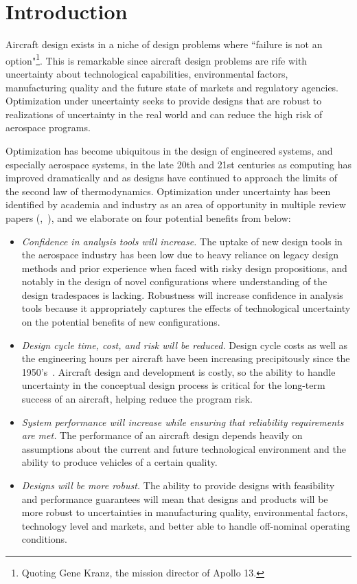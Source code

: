 \section{Introduction}

Aircraft design exists in a niche of design problems where ``failure is
not an option"\footnote{Quoting Gene Kranz, the mission director of Apollo 13.}.
This is remarkable since aircraft design problems are rife with uncertainty about
technological capabilities, environmental factors, manufacturing quality and the future
state of markets and regulatory agencies.
Optimization under uncertainty seeks to provide designs that are robust
to realizations of uncertainty in the real world and can reduce
the high risk of aerospace programs.

Optimization has become ubiquitous in the design of engineered systems, and especially aerospace systems,
in the late 20th and 21st centuries as computing has improved dramatically and as designs have
continued to approach the limits of the second law of thermodynamics. Optimization under uncertainty
has been identified by academia and industry as an area of opportunity
in multiple review papers (\cite{Zang2002},~\cite{Yao2011}),
and we elaborate on four potential benefits from \cite{Zang2002} below:
\begin{itemize}
    \item \emph{Confidence in analysis tools will increase.}
    The uptake of new design tools in the aerospace industry has been low
    due to heavy reliance on legacy design methods and prior experience when
    faced with risky design propositions, and notably in
    the design of novel configurations where understanding
    of the design tradespaces is lacking. Robustness will increase
    confidence in analysis tools because it appropriately captures the
    effects of technological uncertainty on the potential benefits of new
    configurations.
    \item \emph{Design cycle time, cost, and risk will be reduced.}
    Design cycle costs as well as the engineering hours per aircraft have been increasing
    precipitously since the 1950's~\cite{Patt2012}.
    Aircraft design and development is costly, so the ability to handle uncertainty in
    the conceptual design process is critical for the long-term success of an aircraft,
    helping reduce the program risk.
    \item \emph{System performance will increase while ensuring that reliability requirements
    are met.}
    The performance of an aircraft design depends heavily on assumptions about the
    current and future technological environment and the ability to
    produce vehicles of a certain quality.
    \item \emph{Designs will be more robust.}
    The ability to provide designs with feasibility and performance guarantees will mean
    that designs and products will be more robust to uncertainties in manufacturing quality,
    environmental factors, technology level and markets, and better able to
    handle off-nominal operating conditions.
\end{itemize}

